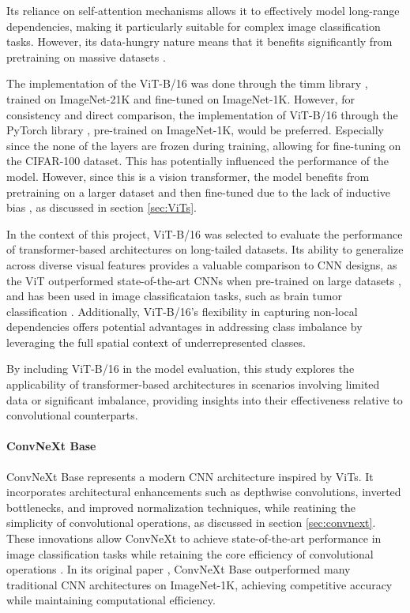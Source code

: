Its reliance on self-attention mechanisms allows it to effectively model long-range dependencies, making it particularly suitable for complex image classification tasks. However, its data-hungry nature means that it benefits significantly from pretraining on massive datasets \cite{dosovitskiy2021imageworth16x16words}.

The implementation of the ViT-B/16 was done through the timm library \cite{huggingface2024vitbase}, trained on ImageNet-21K and fine-tuned on ImageNet-1K. However, for consistency and direct comparison, the implementation of ViT-B/16 through the PyTorch library \cite{torchvision2024vitb16}, pre-trained on ImageNet-1K, would be preferred. Especially since the none of the layers are frozen during training, allowing for fine-tuning on the CIFAR-100 dataset. This has potentially influenced the performance of the model. However, since this is a vision transformer, the model benefits from pretraining on a larger dataset and then fine-tuned due to the lack of inductive bias \cite{dosovitskiy2021imageworth16x16words,kolesnikov2020bigtransferbitgeneral}, as discussed in section \ref{sec:ViTs}.

In the context of this project, ViT-B/16 was selected to evaluate the performance of transformer-based architectures on long-tailed datasets. Its ability to generalize across diverse visual features provides a valuable comparison to CNN designs, as the ViT outperformed state-of-the-art CNNs when pre-trained on large datasets \cite{dosovitskiy2021imageworth16x16words}, and has been used in image classificataion tasks, such as brain tumor classification \cite{asiri2023advancing}. Additionally, ViT-B/16's flexibility in capturing non-local dependencies offers potential advantages in addressing class imbalance by leveraging the full spatial context of underrepresented classes.

By including ViT-B/16 in the model evaluation, this study explores the applicability of transformer-based architectures in scenarios involving limited data or significant imbalance, providing insights into their effectiveness relative to convolutional counterparts.



\paragraph{ConvNeXt Base}
ConvNeXt Base \cite{liu2022convnet2020s} represents a modern CNN architecture inspired by ViTs. It incorporates architectural enhancements such as depthwise convolutions, inverted bottlenecks, and improved normalization techniques, while reatining the simplicity of convolutional operations, as discussed in section \ref{sec:convnext}. These innovations allow ConvNeXt to achieve state-of-the-art performance in image classification tasks while retaining the core efficiency of convolutional operations \cite{liu2022convnet2020s}. In its original paper \cite{liu2022convnet2020s}, ConvNeXt Base outperformed many traditional CNN architectures on ImageNet-1K, achieving competitive accuracy while maintaining computational efficiency. 

